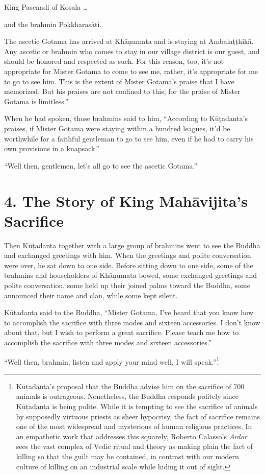 \documentclass[12pt,openany]{book}%
\begin{document}
King Pasenadi of Kosala … 

and the brahmin \textsanskrit{Pokkharasāti}. 

The ascetic Gotama has arrived at \textsanskrit{Khāṇumata} and is staying at \textsanskrit{Ambalaṭṭhikā}. Any ascetic or brahmin who comes to stay in our village district is our guest, and should be honored and respected as such. For this reason, too, it’s not appropriate for Mister Gotama to come to see me, rather, it’s appropriate for me to go to see him. This is the extent of Mister Gotama’s praise that I have memorized. But his praises are not confined to this, for the praise of Mister Gotama is limitless.” 

When he had spoken, those brahmins said to him, “According to \textsanskrit{Kūṭadanta}’s praises, if Mister Gotama were staying within a hundred leagues, it’d be worthwhile for a faithful gentleman to go to see him, even if he had to carry his own provisions in a knapsack.” 

“Well then, gentlemen, let’s all go to see the ascetic Gotama.” 

\section*{4. The Story of King \textsanskrit{Mahāvijita}’s Sacrifice }

Then \textsanskrit{Kūṭadanta} together with a large group of brahmins went to see the Buddha and exchanged greetings with him. When the greetings and polite conversation were over, he sat down to one side. Before sitting down to one side, some of the brahmins and householders of \textsanskrit{Khāṇumata} bowed, some exchanged greetings and polite conversation, some held up their joined palms toward the Buddha, some announced their name and clan, while some kept silent. 

\textsanskrit{Kūṭadanta} said to the Buddha, “Mister Gotama, I’ve heard that you know how to accomplish the sacrifice with three modes and sixteen accessories. I don’t know about that, but I wish to perform a great sacrifice. Please teach me how to accomplish the sacrifice with three modes and sixteen accessories.” 

“Well then, brahmin, listen and apply your mind well, I will speak.”\footnote{\textsanskrit{Kūṭadanta}’s proposal that the Buddha advise him on the sacrifice of 700 animals is outrageous. Nonetheless, the Buddha responds politely since \textsanskrit{Kūṭadanta} is being polite. While it is tempting to see the sacrifice of animals by supposedly virtuous priests as sheer hypocrisy, the fact of sacrifice remains one of the most widespread and mysterious of human religious practices. In an empathetic work that addresses this squarely, Roberto Calasso’s \emph{Ardor} sees the vast complex of Vedic ritual and theory as making plain the fact of killing so that the guilt may be contained, in contrast with our modern culture of killing on an industrial scale while hiding it out of sight. } 
\end{document}
